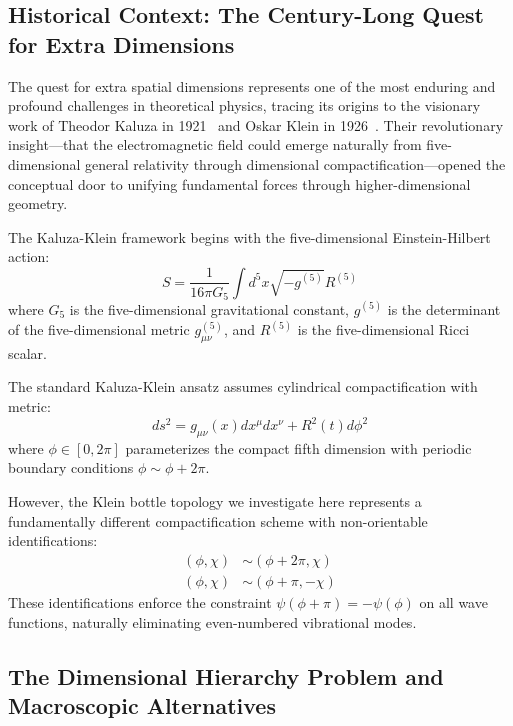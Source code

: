 \documentclass[reprint,amsmath,amssymb,aps,prd]{revtex4-2}
\begin{document}
\subsection{Historical Context: The Century-Long Quest for Extra Dimensions}

The quest for extra spatial dimensions represents one of the most enduring and profound challenges in theoretical physics, tracing its origins to the visionary work of Theodor Kaluza in 1921~\cite{Kaluza1921} and Oskar Klein in 1926~\cite{Klein1926}. Their revolutionary insight—that the electromagnetic field could emerge naturally from five-dimensional general relativity through dimensional compactification—opened the conceptual door to unifying fundamental forces through higher-dimensional geometry.

The Kaluza-Klein framework begins with the five-dimensional Einstein-Hilbert action:
\begin{equation}
S = \frac{1}{16\pi G_5} \int d^5x \sqrt{-g^{(5)}} R^{(5)}
\label{eq:kaluza_klein_action}
\end{equation}
where $G_5$ is the five-dimensional gravitational constant, $g^{(5)}$ is the determinant of the five-dimensional metric $g^{(5)}_{\mu\nu}$, and $R^{(5)}$ is the five-dimensional Ricci scalar.

The standard Kaluza-Klein ansatz assumes cylindrical compactification with metric:
\begin{equation}
ds^2 = g_{\mu\nu}(x) dx^\mu dx^\nu + R^2(t) d\phi^2
\label{eq:standard_kk_metric}
\end{equation}
where $\phi \in [0, 2\pi]$ parameterizes the compact fifth dimension with periodic boundary conditions $\phi \sim \phi + 2\pi$.

However, the Klein bottle topology we investigate here represents a fundamentally different compactification scheme with non-orientable identifications:
\begin{align}
(\phi, \chi) &\sim (\phi + 2\pi, \chi) \label{eq:klein_id1}\\
(\phi, \chi) &\sim (\phi + \pi, -\chi) \label{eq:klein_id2}
\end{align}
These identifications enforce the constraint $\psi(\phi + \pi) = -\psi(\phi)$ on all wave functions, naturally eliminating even-numbered vibrational modes.

\subsection{The Dimensional Hierarchy Problem and Macroscopic Alternatives}
\end{document}
